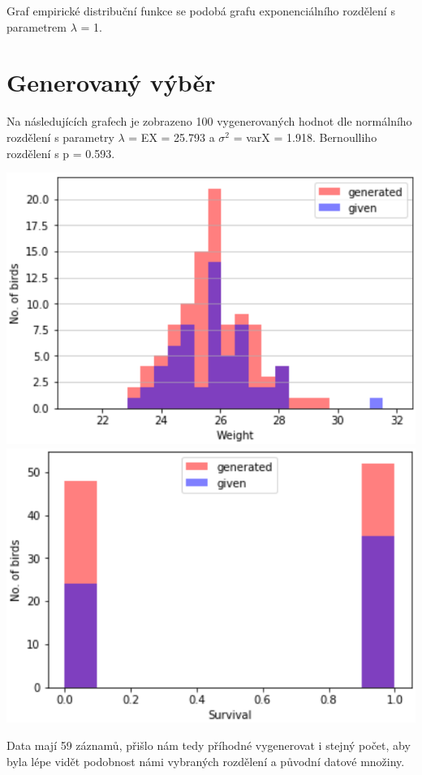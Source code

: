 \documentclass[12pt,a4paper]{article}
\begin{document}
Graf empirické distribuční funkce se podobá grafu exponenciálního rozdělení s parametrem $\lambda$ = 1. 

\section{Generovaný výběr}
Na následujících grafech je zobrazeno 100 vygenerovaných hodnot dle normálního rozdělení s parametry $\lambda$ = EX = 25.793 a $\sigma ^2$ = varX = 1.918. Bernoulliho rozdělení s p = 0.593.

\includegraphics[scale=0.31]{gen_weight_graph2}
\includegraphics[scale=0.31]{gen_survival_graph2}

Data mají 59 záznamů, přišlo nám tedy příhodné vygenerovat i stejný počet, aby byla lépe vidět podobnost námi vybraných rozdělení a původní datové množiny.
\end{document}
